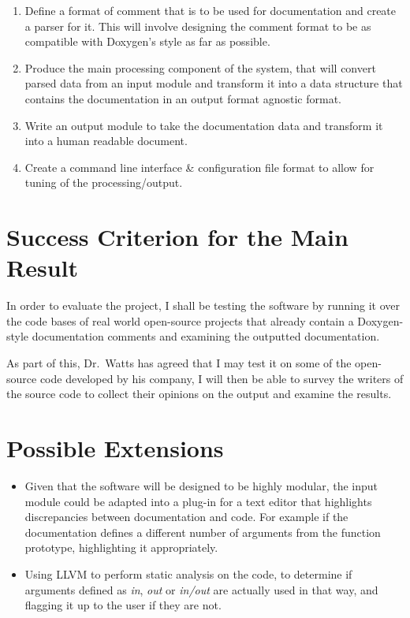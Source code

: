 \begin{enumerate}

\item Define a format of comment that is to be used for documentation
  and create a parser for it. This will involve designing the comment
  format to be as compatible with Doxygen's style as far as possible.
\item Produce the main processing component of the system, that will
  convert parsed data from an input module and transform it into a
  data structure that contains the documentation in an output format
  agnostic format.
\item Write an output module to take the documentation data and
  transform it into a human readable document.
\item Create a command line interface \& configuration file format to
  allow for tuning of the processing/output.
\end{enumerate}

\section{Success Criterion for the Main Result}

In order to evaluate the project, I shall be testing the software by
running it over the code bases of real world open-source projects that
already contain a Doxygen-style documentation comments and examining
the outputted documentation.

As part of this, Dr.~Watts has agreed that I may test it on some of
the open-source code developed by his company, I will then be able to
survey the writers of the source code to collect their opinions on the
output and examine the results.

\section{Possible Extensions}

\begin{itemize}
\item Given that the software will be designed to be highly modular,
  the input module could be adapted into a plug-in for a text editor
  that highlights discrepancies between documentation and code. For
  example if the documentation defines a different number of arguments
  from the function prototype, highlighting it appropriately.
\item Using LLVM to perform static analysis on the code, to determine
  if arguments defined as \emph{in}, \emph{out} or \emph{in/out} are actually used in that
  way, and flagging it up to the user if they are not.
\end{itemize}

